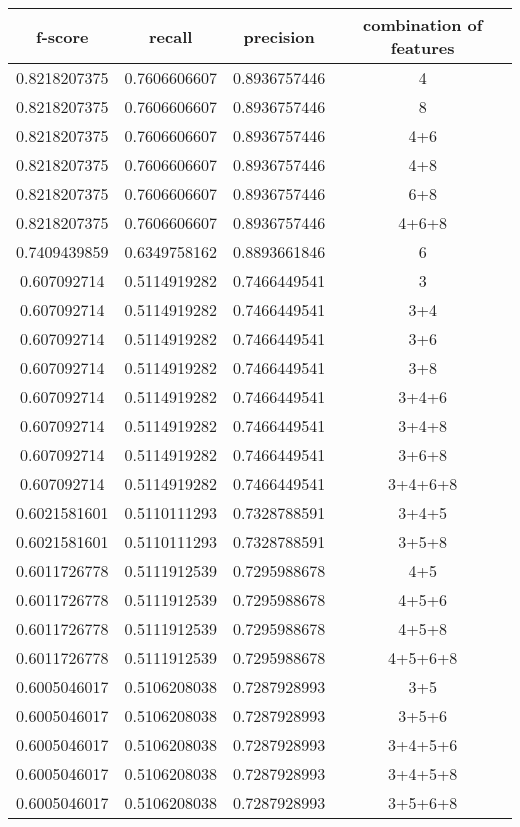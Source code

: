\documentclass[]{article}
\begin{document}
\begin{longtable}{| c | c | c | c |} \hline
		f-score & recall & precision & combination of features \\
		\hline
		0.8218207375 & 0.7606606607 & 0.8936757446 & 4 \\
		0.8218207375 & 0.7606606607 & 0.8936757446 & 8 \\
		0.8218207375 & 0.7606606607 & 0.8936757446 & 4+6 \\
		0.8218207375 & 0.7606606607 & 0.8936757446 & 4+8 \\
		0.8218207375 & 0.7606606607 & 0.8936757446 & 6+8 \\
		0.8218207375 & 0.7606606607 & 0.8936757446 & 4+6+8 \\
		0.7409439859 & 0.6349758162 & 0.8893661846 & 6 \\
		0.607092714 & 0.5114919282 & 0.7466449541 & 3 \\
		0.607092714 & 0.5114919282 & 0.7466449541 & 3+4 \\
		0.607092714 & 0.5114919282 & 0.7466449541 & 3+6 \\
		0.607092714 & 0.5114919282 & 0.7466449541 & 3+8 \\
		0.607092714 & 0.5114919282 & 0.7466449541 & 3+4+6 \\
		0.607092714 & 0.5114919282 & 0.7466449541 & 3+4+8 \\
		0.607092714 & 0.5114919282 & 0.7466449541 & 3+6+8 \\
		0.607092714 & 0.5114919282 & 0.7466449541 & 3+4+6+8 \\
		0.6021581601 & 0.5110111293 & 0.7328788591 & 3+4+5 \\
		0.6021581601 & 0.5110111293 & 0.7328788591 & 3+5+8 \\
		0.6011726778 & 0.5111912539 & 0.7295988678 & 4+5 \\
		0.6011726778 & 0.5111912539 & 0.7295988678 & 4+5+6 \\
		0.6011726778 & 0.5111912539 & 0.7295988678 & 4+5+8 \\
		0.6011726778 & 0.5111912539 & 0.7295988678 & 4+5+6+8 \\
		0.6005046017 & 0.5106208038 & 0.7287928993 & 3+5 \\
		0.6005046017 & 0.5106208038 & 0.7287928993 & 3+5+6 \\
		0.6005046017 & 0.5106208038 & 0.7287928993 & 3+4+5+6 \\
		0.6005046017 & 0.5106208038 & 0.7287928993 & 3+4+5+8 \\
		0.6005046017 & 0.5106208038 & 0.7287928993 & 3+5+6+8 \\

\end{longtable}
\end{document}
